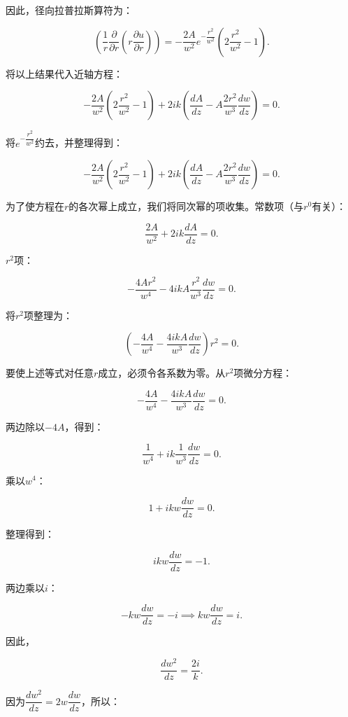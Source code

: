 \begin{enumerate}
\begin{enumerate}
\begin{itemize}
			因此，径向拉普拉斯算符为：
			
			\[
			\left( \dfrac{1}{r} \dfrac{\partial}{\partial r} \left( r \dfrac{\partial u}{\partial r} \right) \right) = - \dfrac{2 A}{w^2} e^{- \dfrac{r^2}{w^2}} \left( 2 \dfrac{r^2}{w^2} - 1 \right).
			\]
			
			将以上结果代入近轴方程：
			
			\[
			- \dfrac{2 A}{w^2} \left( 2 \dfrac{r^2}{w^2} - 1 \right) + 2 i k \left( \dfrac{d A}{d z} - A \dfrac{2 r^2}{w^3} \dfrac{d w}{d z} \right) = 0.
			\]
			
			将\(e^{- \dfrac{r^2}{w^2}}\)约去，并整理得到：
			
			\[
			- \dfrac{2 A}{w^2} \left( 2 \dfrac{r^2}{w^2} - 1 \right) + 2 i k \left( \dfrac{d A}{d z} - A \dfrac{2 r^2}{w^3} \dfrac{d w}{d z} \right) = 0.
			\]
			
			为了使方程在\(r\)的各次幂上成立，我们将同次幂的项收集。常数项（与\(r^0\)有关）：
			
			\[
			\dfrac{2 A}{w^2} + 2 i k \dfrac{d A}{d z} = 0.
			\]
			
			\(r^2\)项：
			
			\[
			- \dfrac{4 A r^2}{w^4} - 4 i k A \dfrac{r^2}{w^3} \dfrac{d w}{d z} = 0.
			\]
			
			将\(r^2\)项整理为：
			
			\[
			\left( - \dfrac{4 A}{w^4} - \dfrac{4 i k A}{w^3} \dfrac{d w}{d z} \right) r^2 = 0.
			\]
			
			要使上述等式对任意\(r\)成立，必须令各系数为零。从\(r^2\)项微分方程：
			
			\[
			- \dfrac{4 A}{w^4} - \dfrac{4 i k A}{w^3} \dfrac{d w}{d z} = 0.
			\]
			
			两边除以\(-4 A\)，得到：
			
			\[
			\dfrac{1}{w^4} + i k \dfrac{1}{w^3} \dfrac{d w}{d z} = 0.
			\]
			
			乘以\(w^4\)：
			
			\[
			1 + i k w \dfrac{d w}{d z} = 0.
			\]
			
			整理得到：
			
			\[
			i k w \dfrac{d w}{d z} = -1.
			\]
			
			两边乘以\(i\)：
			
			\[
			- k w \dfrac{d w}{d z} = - i \implies k w \dfrac{d w}{d z} = i.
			\]
			
			因此，
			
			\[
			\dfrac{d w^2}{d z} = \dfrac{2 i}{k}.
			\]
			
			因为\(\dfrac{d w^2}{d z} = 2 w \dfrac{d w}{d z}\)，所以：
			

\end{itemize}
\end{enumerate}
\end{enumerate}
